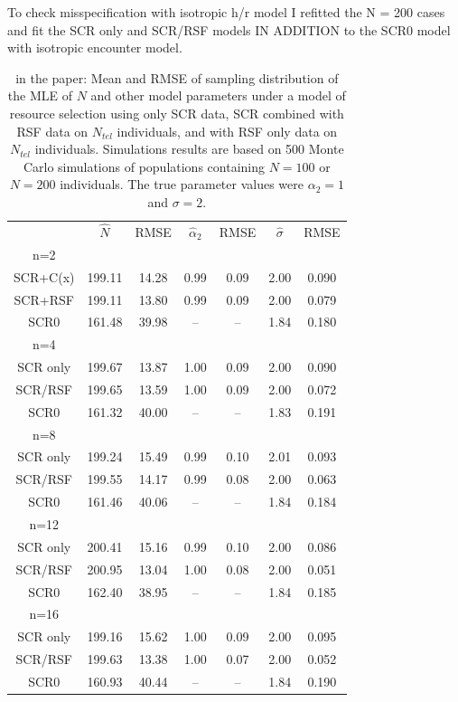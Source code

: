 \begin{table}[ht]
\centering
\caption{To check misspecification with isotropic h/r model I refitted the N =
200 cases and fit the SCR only and SCR/RSF models IN ADDITION to the
SCR0 model with isotropic encounter model.}
\caption{in the paper:
Mean and RMSE of sampling distribution of the MLE of $N$ and
  other model parameters under a model of resource selection using
  only SCR data, SCR combined with RSF data on $N_{tel}$ individuals,
  and with RSF only data on $N_{tel}$ individuals. Simulations results
  are based on 500 Monte Carlo simulations of populations containing
  $N=100$ or $N=200$ individuals. The true parameter values were
  $\alpha_{2} = 1$ and $\sigma = 2$.
}
\begin{tabular}{ccccccc}
        &  $\hat{N}$ &RMSE   &  $\hat{\alpha}_{2}$ &RMSE  & $\hat{\sigma}$ & RMSE    \\
n=2     &       &       &       &      &        &         \\
SCR+C(x)& 199.11&  14.28&  0.99 &  0.09&   2.00 &  0.090  \\
SCR+RSF & 199.11&  13.80&  0.99 &  0.09&   2.00 &  0.079  \\
SCR0    & 161.48&  39.98&   --  &   -- &   1.84 &  0.180  \\
n=4   &       &      &        &    &        &          \\
SCR only& 199.67&  13.87&   1.00&   0.09 &  2.00&   0.090 \\
SCR/RSF & 199.65&  13.59&   1.00&   0.09 &  2.00&   0.072\\
SCR0    & 161.32&  40.00&    -- &    --  &  1.83&   0.191\\
n=8    &       &      &        &    &        &          \\
SCR only& 199.24&  15.49&   0.99&   0.10&   2.01&   0.093 \\
SCR/RSF & 199.55&  14.17&   0.99&   0.08&   2.00&   0.063\\
SCR0    & 161.46&  40.06&    -- &    -- &   1.84&   0.184\\
n=12    &       &      &        &    &        &          \\
SCR only& 200.41&  15.16&   0.99&   0.10&   2.00&   0.086\\
SCR/RSF & 200.95&  13.04&   1.00&   0.08&   2.00&   0.051\\
SCR0    & 162.40&  38.95&    -- &    -- &   1.84&   0.185\\
n=16     &       &      &        &    &        &          \\
SCR only &199.16 & 15.62&   1.00 &  0.09&   2.00&   0.095 \\
SCR/RSF  &199.63 & 13.38&   1.00 &  0.07&   2.00&   0.052\\
SCR0     &160.93 & 40.44&    --  &   -- &   1.84&   0.190\\
\end{tabular}
\end{table}


